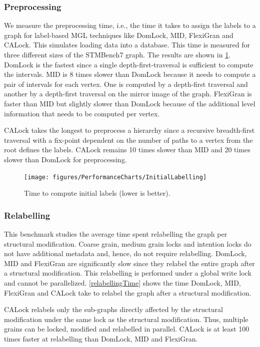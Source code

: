 \subsubsection{Preprocessing}
We measure the preprocessing time, i.e., the time it takes to assign the labels to a graph for label-based MGL techniques like DomLock, MID, FlexiGran and CALock.
This simulates loading data into a database.
This time is measured for three different sizes of the STMBench7 graph. 
The results are shown in \cref{initialLabelling}. 
DomLock is the fastest since a single depth-first-traversal is sufficient to compute the intervals. MID is 8 times slower than DomLock because it needs to compute a pair of intervals for each vertex. One is computed by a depth-first traversal and another by a depth-first traversal on the mirror image of the graph. FlexiGran is faster than MID but slightly slower than DomLock because of the additional level information that needs to be computed per vertex. 

CALock takes the longest to preprocess a hierarchy since a recursive breadth-first traversal with a fix-point dependent on the number of paths to a vertex from the root defines the labels. CALock remains 10 times slower than MID and 20 times slower than DomLock for preprocessing. 

\begin{figure}
	\centering
	\captionsetup{justification=centering}
	\texttt{[image: figures/PerformanceCharts/InitialLabelling]}
	\caption{Time to compute initial labels (lower is better).}
	\label{initialLabelling}
\end{figure}


\subsubsection{Relabelling}
This benchmark studies the average time spent relabelling the graph per structural modification. Coarse grain, medium grain locks and intention locks do not have additional metadata and, hence, do not require relabelling. 
DomLock, MID and FlexiGran are significantly slow since they relabel the entire graph after a structural modification. This relabelling is performed under a global write lock and cannot be parallelized. \cref{relabellingTime} shows the time DomLock, MID, FlexiGran and CALock take to relabel the graph after a structural modification.

CALock relabels only the sub-graphs directly affected by the structural modification under the same lock as the structural modification.
Thus, multiple grains can be locked, modified and relabelled in parallel. CALock is at least 100 times faster at relabelling than DomLock, MID and FlexiGran.

